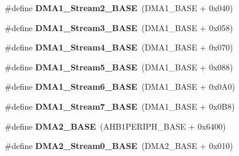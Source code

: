 \begin{DoxyCompactItemize}
\item 
\#define {\bfseries D\+M\+A1\+\_\+\+Stream2\+\_\+\+B\+A\+SE}~(D\+M\+A1\+\_\+\+B\+A\+SE + 0x040)\hypertarget{group___peripheral__memory__map_ga48a551ee91d3f07dd74347fdb35c703d}{}\label{group___peripheral__memory__map_ga48a551ee91d3f07dd74347fdb35c703d}

\item 
\#define {\bfseries D\+M\+A1\+\_\+\+Stream3\+\_\+\+B\+A\+SE}~(D\+M\+A1\+\_\+\+B\+A\+SE + 0x058)\hypertarget{group___peripheral__memory__map_gac51deb54ff7cfe1290dfcf517ae67127}{}\label{group___peripheral__memory__map_gac51deb54ff7cfe1290dfcf517ae67127}

\item 
\#define {\bfseries D\+M\+A1\+\_\+\+Stream4\+\_\+\+B\+A\+SE}~(D\+M\+A1\+\_\+\+B\+A\+SE + 0x070)\hypertarget{group___peripheral__memory__map_ga757a3c0d866c0fe68c6176156065a26b}{}\label{group___peripheral__memory__map_ga757a3c0d866c0fe68c6176156065a26b}

\item 
\#define {\bfseries D\+M\+A1\+\_\+\+Stream5\+\_\+\+B\+A\+SE}~(D\+M\+A1\+\_\+\+B\+A\+SE + 0x088)\hypertarget{group___peripheral__memory__map_ga0ded7bed8969fe2e2d616e7f90eb7654}{}\label{group___peripheral__memory__map_ga0ded7bed8969fe2e2d616e7f90eb7654}

\item 
\#define {\bfseries D\+M\+A1\+\_\+\+Stream6\+\_\+\+B\+A\+SE}~(D\+M\+A1\+\_\+\+B\+A\+SE + 0x0\+A0)\hypertarget{group___peripheral__memory__map_ga58998ddc40adb6361704d6c9dad08125}{}\label{group___peripheral__memory__map_ga58998ddc40adb6361704d6c9dad08125}

\item 
\#define {\bfseries D\+M\+A1\+\_\+\+Stream7\+\_\+\+B\+A\+SE}~(D\+M\+A1\+\_\+\+B\+A\+SE + 0x0\+B8)\hypertarget{group___peripheral__memory__map_ga82186dd6d3f60995d428b34c041919d7}{}\label{group___peripheral__memory__map_ga82186dd6d3f60995d428b34c041919d7}

\item 
\#define {\bfseries D\+M\+A2\+\_\+\+B\+A\+SE}~(A\+H\+B1\+P\+E\+R\+I\+P\+H\+\_\+\+B\+A\+SE + 0x6400)\hypertarget{group___peripheral__memory__map_gab72a9ae145053ee13d1d491fb5c1df64}{}\label{group___peripheral__memory__map_gab72a9ae145053ee13d1d491fb5c1df64}

\item 
\#define {\bfseries D\+M\+A2\+\_\+\+Stream0\+\_\+\+B\+A\+SE}~(D\+M\+A2\+\_\+\+B\+A\+SE + 0x010)\hypertarget{group___peripheral__memory__map_gac4c67b24726ba6b94d03adb351bcec4d}{}\label{group___peripheral__memory__map_gac4c67b24726ba6b94d03adb351bcec4d}


\end{DoxyCompactItemize}
